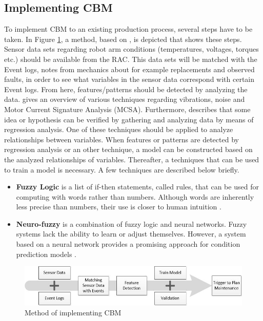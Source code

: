 \subsection{Implementing CBM} \label{Implementing CBM}
To implement CBM to an existing production process, several steps have to be taken. In Figure \ref{fig:Method CBM}, a method, based on \citet{maxgrip}, is depicted that shows these steps. Sensor data sets regarding robot arm conditions (temperatures, voltages, torques etc.) should be available from the RAC. This data sets will be matched with the Event logs, notes from mechanics about for example replacements and observed faults, in order to see what variables in the sensor data correspond with certain Event logs. From here, features/patterns should be detected by analyzing the data. \citet{Jaber2017} gives an overview of various techniques regarding vibrations, noise and Motor Current Signature Analysis (MCSA). Furthermore, \citet{Kahane2007} describes that some idea or hypothesis can be verified by gathering and analyzing data by means of regression analysis. One of these techniques should be applied to analyze relationships between variables. When features or patterns are detected by regression analysis or an other technique, a model can be constructed based on the analyzed relationships of variables. Thereafter, a techniques that can be used to train a model is necessary. A few techniques are described below briefly.
\begin{itemize}
\item \textbf{Fuzzy Logic} is a list of if-then statements, called rules, that can be used for computing with words rather than numbers. Although words are inherently less precise than numbers, their use is closer to human intuition \parencite{FuzzyToolbox}.
\item \textbf{Neuro-fuzzy} is a combination of fuzzy logic and neural networks. Fuzzy systems lack the ability to learn or adjust themselves. However, a system based on a neural network provides a promising approach for condition prediction models \parencite{Zhao2009}.  
\end{itemize}
\begin{figure}[ht]
\centering
\includegraphics[width=\textwidth]{Figures/CBM_Method2}
\caption[Method of implementing CBM]{Method of implementing CBM}
\label{fig:Method CBM}
\end{figure}

